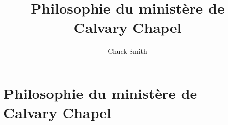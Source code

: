 \documentclass[paper=a5,pagesize=pdftex,13pt]{scrbook}
\title{Philosophie du ministère de Calvary Chapel}
\author{Chuck Smith}
\begin{document}
\maketitle

\chapter*{Philosophie du ministère de Calvary Chapel}


\end{document}
